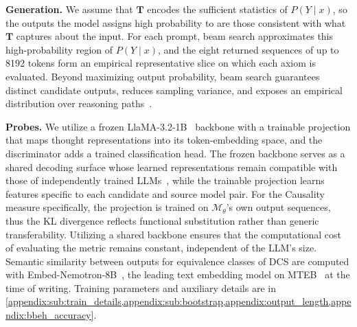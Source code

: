 \textbf{Generation.} We assume that $\mathbf{T}$ encodes the sufficient statistics of $P(Y \mid x)$, so the outputs the model assigns high probability to are those consistent with what $\mathbf{T}$ captures about the input. For each prompt, beam search approximates this high-probability region of $P(Y \mid x)$, and the eight returned sequences of up to 8192 tokens form an empirical representative slice on which each axiom is evaluated. Beyond maximizing output probability, beam search guarantees distinct candidate outputs, reduces sampling variance, and exposes an empirical distribution over reasoning paths~\citep{fadeeva2026dont}.

\textbf{Probes.} We utilize a frozen LlaMA-3.2-1B~\citep{grattafiori2024llama3herdmodels} backbone with a trainable projection that maps thought representations into its token-embedding space, and the discriminator adds a trained classification head. The frozen backbone serves as a shared decoding surface whose learned representations remain compatible with those of independently trained LLMs~\citep{salhan2026do}, while the trainable projection learns features specific to each candidate and source model pair. For the Causality measure specifically, the projection is trained on $\mathcal{M}_\theta$'s own output sequences, thus the KL divergence reflects functional substitution rather than generic transferability. Utilizing a shared backbone ensures that the computational cost of evaluating the metric remains constant, independent of the LLM's size. Semantic similarity between outputs for equivalence classes of DCS are computed with Embed-Nemotron-8B~\citep{babakhin2025llamaembednemotron8buniversaltextembedding}, the leading text embedding model on MTEB~\citep{muennighoff2023mtebmassivetextembedding} at the time of writing. Training parameters and auxiliary details are in \cref{appendix:sub:train_details,appendix:sub:bootstrap,appendix:output_length,appendix:bbeh_accuracy}.


